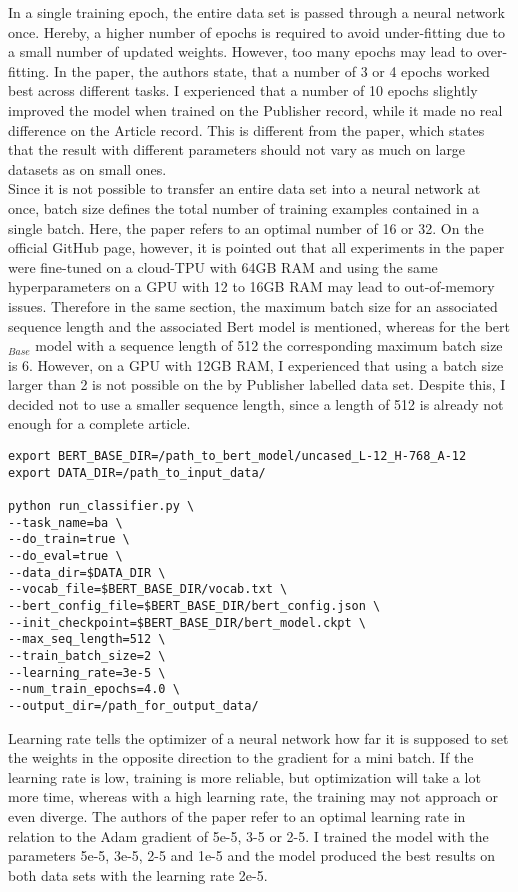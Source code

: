 \documentclass[a4paper, 11pt,titlepage,oneside,openany]{book}
\begin{document}
\indent In a  single training epoch, the entire data set is passed through a neural network once. Hereby, a higher number of epochs is required to avoid under-fitting due to a small number of updated weights. However, too many epochs may lead to over-fitting. In the paper, the authors state, that a number of  3 or 4 epochs worked best across different tasks. I experienced that a number of 10 epochs slightly improved the model when trained on the Publisher record, while it made no real difference on the Article record. This is different from the paper, which states that the result with different parameters should not vary as much on large datasets as on small ones.  \\
\indent Since it is not possible to transfer an entire data set into a neural network at once, batch size defines the total number of training examples contained in a single batch. Here, the paper refers  to an optimal number of 16 or 32. On the official GitHub page, however, it is pointed out that all experiments in the paper were fine-tuned on a cloud-TPU with 64GB RAM and using the same hyperparameters  on a GPU with 12 to 16GB RAM may lead to out-of-memory issues. Therefore in the same section, the maximum batch size for an associated sequence length and the associated Bert model is mentioned, whereas for the \gls{bert}$_{Base}$ model with a sequence length of 512 the corresponding maximum batch size is 6. However, on
a GPU with 12GB RAM, I  experienced that using a batch size larger than 2 is not possible on the by Publisher labelled data set. Despite this, I decided not to use a smaller sequence length, since a length of 512 is already not enough for a complete article. 
\newpage
\begin{lstlisting}[caption=run\_classifier prompt with FLAGS]
export BERT_BASE_DIR=/path_to_bert_model/uncased_L-12_H-768_A-12
export DATA_DIR=/path_to_input_data/

python run_classifier.py \
--task_name=ba \
--do_train=true \
--do_eval=true \
--data_dir=$DATA_DIR \
--vocab_file=$BERT_BASE_DIR/vocab.txt \
--bert_config_file=$BERT_BASE_DIR/bert_config.json \
--init_checkpoint=$BERT_BASE_DIR/bert_model.ckpt \
--max_seq_length=512 \
--train_batch_size=2 \
--learning_rate=3e-5 \
--num_train_epochs=4.0 \
--output_dir=/path_for_output_data/
\end{lstlisting}
\indent Learning rate tells the optimizer of a neural network how far it is supposed to set the weights in the opposite direction to the gradient for a mini batch. If the learning rate is low, training is more reliable, but  optimization will take a lot more time, whereas with a high learning rate, the training may not approach or even diverge. The authors of the paper refer to an optimal learning rate in relation to the Adam gradient \cite{adam} of 5e-5, 3-5 or 2-5. I trained the model with the parameters 5e-5, 3e-5, 2-5 and 1e-5 and the model produced the best results on both data sets with the learning rate 2e-5. 
\end{document}
